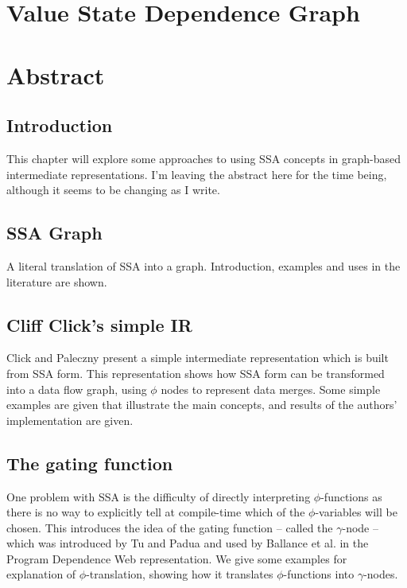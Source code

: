 \section{Value State Dependence Graph}



\section*{Abstract}

\subsection*{Introduction}

This chapter will explore some approaches to using SSA concepts in graph-based intermediate representations. I'm leaving the abstract here for the time being, although it seems to be changing as I write.

\subsection*{SSA Graph}

A literal translation of SSA into a graph. Introduction, examples and uses in the literature are shown.

\subsection*{Cliff Click's simple IR}

Click and Paleczny  \cite{202534} present a simple intermediate representation which is built from SSA form. This representation shows how SSA form can be transformed into a data flow graph, using $\phi$ nodes to represent data merges. Some simple examples are given that illustrate the main concepts, and results of the authors' implementation are given.

\subsection*{The gating function}

One problem with SSA is the difficulty of directly interpreting $\phi$-functions as there is no way to explicitly tell at compile-time which of the $\phi$-variables will be chosen. This introduces the idea of the gating function -- called the $\gamma$-node -- which was introduced by Tu and Padua \cite{207115} and used by Ballance et al. in the Program Dependence Web\cite{93578} representation. We give some examples for explanation of $\phi$-translation, showing how it translates $\phi$-functions into $\gamma$-nodes.

